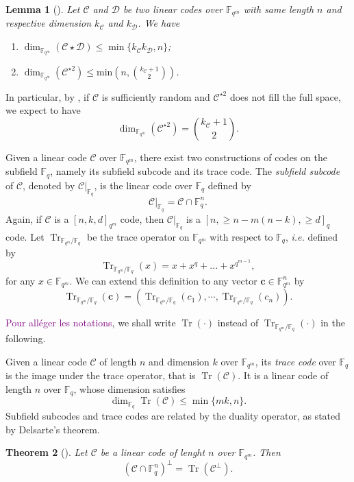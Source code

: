 \documentclass[a4paper]{amsart}
\newtheorem{thm}{Theorem}[section]
\newtheorem{lemma}[thm]{Lemma}
\theoremstyle{definition}
\theoremstyle{remark}
\newcommand{\calC}{\mathcal{C}}
\newcommand{\calD}{\mathcal{D}}
\newcommand{\fqm}{\mathbb{F}_{q^m}}
\newcommand{\fq}{\mathbb{F}_{q}}
\newcommand{\Trm}[1]{\operatorname{Tr}_{\mathbb{F}_{q^m}/\fq}\left(#1\right)}
\newcommand{\Tr}[1]{\operatorname{Tr}\left(#1\right)}
\newcommand\jade[1]{\textcolor{purple}{#1}}
\begin{document}
\begin{lemma}[{\cite[Proposition~10]{MT21}}] \label{lem:known_bounds}
Let $\calC$ and $\calD$ be two linear codes over $\fqm$ with same length $n$ and respective dimension $k_{\calC}$ and $k_{\calD}$. We have
\begin{enumerate}
 \item $\dim_{\fqm}(\calC \star \calD) \leq \min\{k_{\calC}k_{\calD},n\}$;
 \item\label{it:dim_C^2} $\displaystyle \dim_{\mathbb{F}_{q^m}}(\calC^{\star2}) \leq \mathrm{min}\left(n,\binom{k_{\calC}+1}{2}\right)$.
 \end{enumerate}
\end{lemma}

In particular, by \cite[Theorem~2.3]{CCMZ15}, if $\calC$ is sufficiently random and $\calC^{\star2}$ does not fill the full space, we expect to have 
\[ \dim_{\fqm}(\calC^{\star2}) = \binom{k_{\calC}+1}{2}.\]

Given a linear code $\calC$ over $\fqm$, there exist two constructions of codes on the subfield $\fq$, namely its subfield subcode and its trace code. The \emph{subfield subcode} of $\calC$, denoted by $\calC|_{\fq}$, is the linear code over $\fq$ defined by 
\[\calC|_{\fq}=\calC \cap \mathbb{F}_q^n.\]
Again, if $\calC$ is a $[n,k,d]_{q^m}$ code, then $\calC|_{\fq}$ is a $[n,\geq n-m(n-k),\geq d]_q$ code.
Let $\operatorname{Tr}_{\mathbb{F}_{q^m}/\fq}$ be the trace operator on $\mathbb{F}_{q^m}$ with respect to $\mathbb{F}_q$, \emph{i.e.} defined by
\[\Trm{x} = x + x^q + ... + x^{q^{m-1}},\]
for any $x \in \fqm$. We can extend this definition to any vector $\mathbf{c} \in \fqm^n$ by $$\Trm{\mathbf{c}}= (\Trm{c_1},\cdots,\Trm{c_n}).$$

\jade{Pour alléger les notations}, we shall write $\Tr{\cdot}$ instead of $\Trm{\cdot}$ in the following.

Given a linear code $\calC$ of length $n$ and dimension $k$ over $\fqm$, its \emph{trace code} over $\fq$ is the image under the trace operator, that is $\Tr{\calC}$. It is a linear code of length $n$ over $\fq$, whose dimension satisfies
\begin{equation}\label{eq:dim_trace}
\dim_{\mathbb{F}_q} \Tr{\calC} \leq \min\{mk,n\}.
\end{equation}
Subfield subcodes and trace codes are related by the duality operator, as stated by Delsarte's theorem.

\begin{thm}[{\cite[Delsarte's theorem]{Del75}}] \label{th:delsarte}
Let $\calC$ be a linear code of lenght $n$ over $\fqm$. Then
\[\left(\calC \cap \fq^n\right)^{\perp} = \Tr{\calC^{\perp}}.\]
\end{thm}
\end{document}
